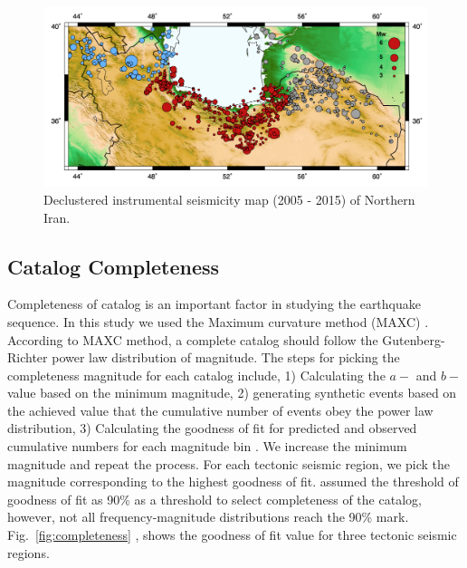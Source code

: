 \begin{figure} [ht]
\centering
\includegraphics[scale=0.6]{figures/pdf/Figure02.pdf} 
\caption{Declustered instrumental seismicity map (2005 - 2015) of Northern Iran.}
\label{fig:seismicity}
\end{figure}


\subsection{Catalog Completeness}
\noindent
Completeness of catalog is an important factor in studying the earthquake sequence.  In this study we used the Maximum curvature method (MAXC) \citep{Wiemer2000}. According to MAXC method, a complete catalog should follow the Gutenberg-Richter power law distribution of magnitude. The steps for picking the completeness magnitude for each catalog include, 1) Calculating the $a-$ and $b-$ value based on the minimum magnitude, 2) generating  synthetic events based on the achieved value that the cumulative number of events obey the power law distribution, 3) Calculating the goodness of fit for predicted and observed cumulative numbers for each magnitude bin \citep{Wiemer2000}. We increase the minimum magnitude and repeat the process. For each tectonic seismic region, we pick the magnitude corresponding to the highest goodness of fit.  \citet{Wiemer2000} assumed the threshold of goodness of fit as 90\% as a threshold to select completeness of the catalog, however,  not all frequency-magnitude distributions reach the 90\% mark. Fig.~\ref{fig:completeness} , shows the goodness of fit value for three tectonic seismic regions. 

